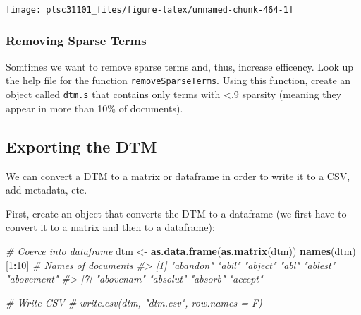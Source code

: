 \documentclass[]{book}
\newenvironment{Shaded}{\begin{snugshade}}{\end{snugshade}}
\newcommand{\KeywordTok}[1]{\textcolor[rgb]{0.13,0.29,0.53}{\textbf{#1}}}
\newcommand{\DecValTok}[1]{\textcolor[rgb]{0.00,0.00,0.81}{#1}}
\newcommand{\StringTok}[1]{\textcolor[rgb]{0.31,0.60,0.02}{#1}}
\newcommand{\CommentTok}[1]{\textcolor[rgb]{0.56,0.35,0.01}{\textit{#1}}}
\newcommand{\OperatorTok}[1]{\textcolor[rgb]{0.81,0.36,0.00}{\textbf{#1}}}
\newcommand{\NormalTok}[1]{#1}
\begin{document}
\begin{center}\texttt{[image: plsc31101\_files/figure-latex/unnamed-chunk-464-1]} \end{center}

\subsubsection*{Removing Sparse Terms}\label{removing-sparse-terms}

Somtimes we want to remove sparse terms and, thus, increase efficency.
Look up the help file for the function \texttt{removeSparseTerms}. Using
this function, create an object called \texttt{dtm.s} that contains only
terms with \textless{}.9 sparsity (meaning they appear in more than 10\%
of documents).

\begin{Shaded}
\end{Shaded}

\subsection{Exporting the DTM}\label{exporting-the-dtm}

We can convert a DTM to a matrix or dataframe in order to write it to a
CSV, add metadata, etc.

First, create an object that converts the DTM to a dataframe (we first
have to convert it to a matrix and then to a dataframe):

\begin{Shaded}
\begin{Highlighting}[]
\CommentTok{# Coerce into dataframe}
\NormalTok{dtm <-}\StringTok{ }\KeywordTok{as.data.frame}\NormalTok{(}\KeywordTok{as.matrix}\NormalTok{(dtm))}
\KeywordTok{names}\NormalTok{(dtm)[}\DecValTok{1}\OperatorTok{:}\DecValTok{10}\NormalTok{]  }\CommentTok{# Names of documents}
\CommentTok{#>  [1] "abandon"   "abil"      "abject"    "abl"       "ablest"    "abovement"}
\CommentTok{#>  [7] "abovenam"  "absolut"   "absorb"    "accept"}

\CommentTok{# Write CSV}
\CommentTok{# write.csv(dtm, "dtm.csv", row.names = F)}
\end{Highlighting}
\end{Shaded}
\end{document}
